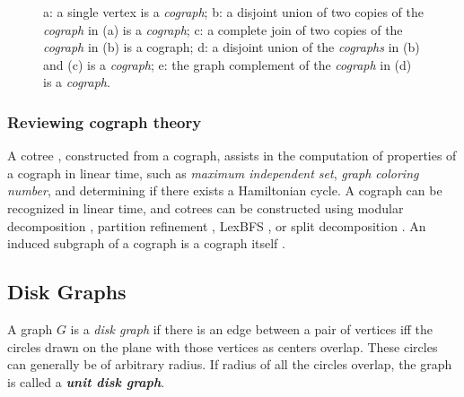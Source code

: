 \begin{figure}
{
    }
    \caption{a: a single vertex is a \textit{cograph}; b: a disjoint union of two copies of the \textit{cograph} in (a) is a \textit{cograph}; c: a complete join of two copies of the \textit{cograph} in (b) is a cograph; d: a disjoint union of the \textit{cographs} in (b) and (c) is a \textit{cograph}; e: the graph complement of the \textit{cograph} in (d) is a \textit{cograph}.}
    \label{figure:example-cographs}
\end{figure}

\subsubsection{Reviewing cograph theory}

A cotree \cite{Corneil1981}, constructed from a cograph, assists in the computation of properties of a cograph in linear time, such as \textit{maximum independent set}, \textit{graph coloring number}, and determining if there exists a Hamiltonian cycle. A cograph can be recognized in linear time, and cotrees can be constructed using modular decomposition \cite{Corneil1985}, partition refinement \cite{Habib2005}, LexBFS \cite{Bretscher2008}, or split decomposition \cite{Gioan2012}.  An induced subgraph of a cograph is a cograph itself \cite{Damaschke1990}.

\subsection{Disk Graphs}

A graph $G$ is a \textit{disk graph}  if there is an edge between a pair of vertices iff the circles drawn on the plane with those vertices as centers overlap. These circles can generally be of arbitrary radius. If radius of all the circles overlap, the graph is called a \textbf{\textit{unit disk graph}}.

